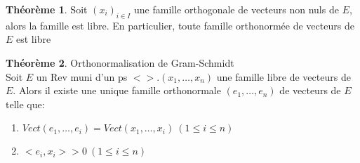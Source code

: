\documentclass[fleqn]{article}
\theoremstyle{definition} \newtheorem*{defi}{D\'efinition}
\theoremstyle{definition} \newtheorem*{theo}{Th\'eor\`eme}
\theoremstyle{definition} \newtheorem*{coro}{Corollaire}
\theoremstyle{remark} \newtheorem*{rqs}{Remarques}
\theoremstyle{definition} \newtheorem*{prop}{Propri\'et\'e}
\begin{document}
\begin{theo} Soit $(x_i)_{i\in I}$ une famille orthogonale de vecteurs non nuls de $E$, alors la famille est libre. En particulier, toute famille
orthonorm\'ee de vecteurs de $E$ est libre
\end{theo}

\begin{theo} Orthonormalisation de Gram-Schmidt \\
Soit $E$ un Rev muni d'un ps $<>. (x_1, \hdots, x_n)$ une famille libre de vecteurs de $E$. Alors il existe une unique famille orthonormale
$(e_1, \hdots, e_n)$ de vecteurs de $E$ telle que:
\begin{enumerate}
	\item $Vect(e_1, \hdots, e_i) = Vect(x_1, \hdots, x_i)\ (1 \leq i \leq n)$
	\item $<e_i,x_i> >0\ (1 \leq i \leq n)$
\end{enumerate}

\end{theo}
\end{document}
